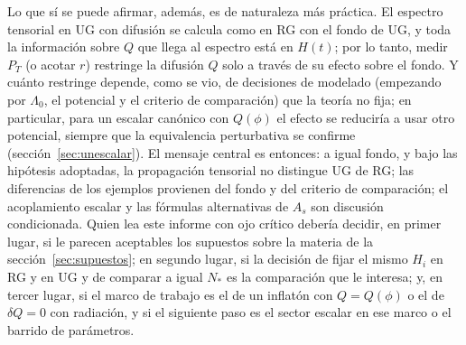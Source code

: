 Lo que sí se puede afirmar, además, es de naturaleza más práctica. El espectro tensorial en UG con difusión se calcula como en RG con el fondo de UG, y toda la información sobre $Q$ que llega al espectro está en $H(t)$; por lo tanto, medir $P_T$ (o acotar $r$) restringe la difusión $Q$ solo a través de su efecto sobre el fondo. Y cuánto restringe depende, como se vio, de decisiones de modelado (empezando por $\Lambda_0$, el potencial y el criterio de comparación) que la teoría no fija; en particular, para un escalar canónico con $Q(\phi)$ el efecto se reduciría a usar otro potencial, siempre que la equivalencia perturbativa se confirme (sección~\ref{sec:unescalar}). El mensaje central es entonces: a igual fondo, y bajo las hipótesis adoptadas, la propagación tensorial no distingue UG de RG; las diferencias de los ejemplos provienen del fondo y del criterio de comparación; el acoplamiento escalar y las fórmulas alternativas de $A_s$ son discusión condicionada. Quien lea este informe con ojo crítico debería decidir, en primer lugar, si le parecen aceptables los supuestos sobre la materia de la sección~\ref{sec:supuestos}; en segundo lugar, si la decisión de fijar el mismo $H_i$ en RG y en UG y de comparar a igual $N_*$ es la comparación que le interesa; y, en tercer lugar, si el marco de trabajo es el de un inflatón con $Q=Q(\phi)$ o el de $\delta Q=0$ con radiación, y si el siguiente paso es el sector escalar en ese marco o el barrido de parámetros.
